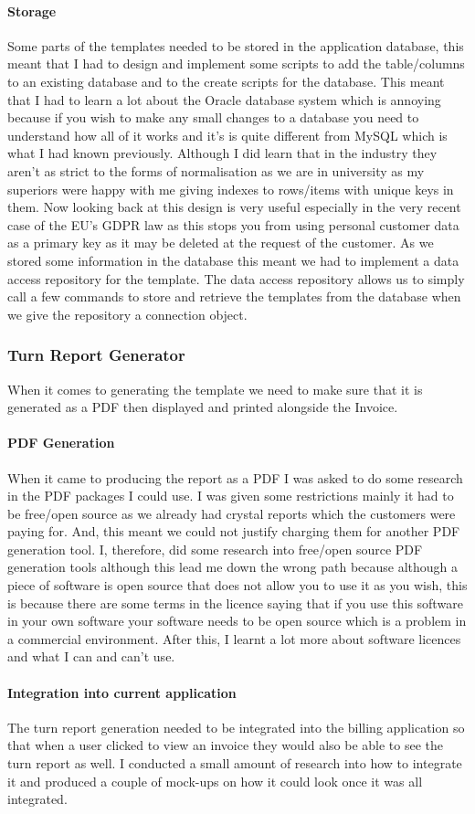 {{		\paragraph{Storage}{Some parts of the templates needed to be stored in the application database, this meant that I had to design and implement some scripts to add the table/columns to an existing database and to the create scripts for the database. This meant that I had to learn a lot about the Oracle database system which is annoying because if you wish to make any small changes to a database you need to understand how all of it works and it's is quite different from MySQL which is what I had known previously. Although I did learn that in the industry they aren't as strict to the forms of normalisation as we are in university as my superiors were happy with me giving indexes to rows/items with unique keys in them. Now looking back at this design is very useful especially in the very recent case of the EU's GDPR law as this stops you from using personal customer data as a primary key as it may be deleted at the request of the customer. As we stored some information in the database this meant we had to implement a data access repository for the template. The data access repository allows us to simply call a few commands to store and retrieve the templates from the database when we give the repository a connection object.}
	}
	\subsubsection*{Turn Report Generator}{
		When it comes to generating the template we need to make sure that it is generated as a PDF then displayed and printed alongside the Invoice.
		\paragraph{PDF Generation}{
			When it came to producing the report as a PDF I was asked to do some research in the PDF packages I could use. I was given some restrictions mainly it had to be free/open source as we already had crystal reports which the customers were paying for. And, this meant we could not justify charging them for another PDF generation tool. I, therefore, did some research into free/open source PDF generation tools although this lead me down the wrong path because although a piece of software is open source that does not allow you to use it as you wish, this is because there are some terms in the licence saying that if you use this software in your own software your software needs to be open source which is a problem in a commercial environment. After this, I learnt a lot more about software licences and what I can and can't use.
		}
		\paragraph{Integration into current application}{
			The turn report generation needed to be integrated into the billing application so that when a user clicked to view an invoice they would also be able to see the turn report as well. I conducted a small amount of research into how to integrate it and produced a couple of mock-ups on how it could look once it was all integrated.
		}
	}
}